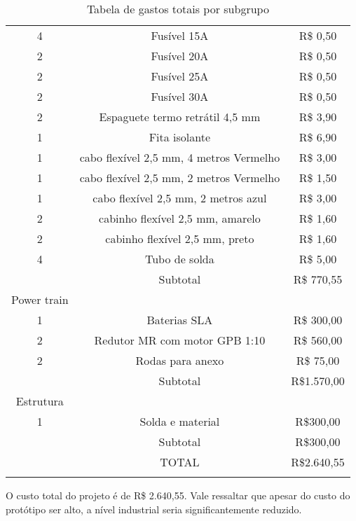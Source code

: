 \begin{longtable}{|c|c|c|}
4 & Fusível 15A & R\$ 0,50 \\
2 & Fusível 20A & R\$ 0,50 \\
2 & Fusível 25A & R\$ 0,50 \\
2 & Fusível 30A & R\$ 0,50 \\
2 & Espaguete termo retrátil 4,5 mm & R\$ 3,90 \\
1 & Fita isolante & R\$ 6,90 \\
1 & cabo flexível 2,5 mm, 4 metros Vermelho & R\$ 3,00 \\
1 & cabo flexível 2,5 mm, 2 metros Vermelho & R\$ 1,50 \\
1 & cabo flexível 2,5 mm, 2 metros azul & R\$ 3,00 \\
2 & cabinho flexível 2,5 mm, amarelo & R\$ 1,60 \\
2 & cabinho flexível 2,5 mm, preto & R\$ 1,60 \\
4 & Tubo de solda & R\$ 5,00 \\
 & Subtotal & R\$ 770,55 \\ \hline
Power train &  &  \\
1 & Baterias SLA & R\$ 300,00 \\
2 & Redutor MR com motor GPB 1:10 & R\$ 560,00 \\
2 & Rodas para anexo & R\$ 75,00 \\
 & Subtotal & R\$1.570,00 \\ \hline
Estrutura &  &  \\
1 & Solda e material & R\$300,00 \\
 & Subtotal & R\$300,00 \\ \hline
 & TOTAL & R\$2.640,55 \\ \hline
\caption{Tabela de gastos totais por subgrupo}
\label{tab:custos_tabela}
\end{longtable}

O custo total do projeto é de R\$ 2.640,55.  Vale ressaltar que apesar do custo do protótipo ser alto, a nível industrial seria significantemente reduzido.
